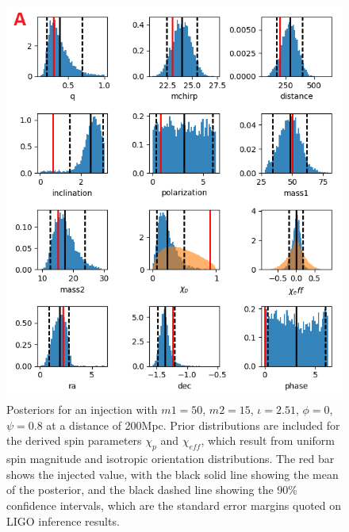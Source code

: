 \documentclass[11pt]{article}
\begin{document}
\begin{figure}
	\includegraphics[width=1\textwidth]{fig14.png}
	\centering
	\caption{Posteriors for an injection with $m1=50$, $m2=15$, $\iota=2.51$, $\phi=0$, $\psi=0.8$ at a distance of 200Mpc. Prior distributions are included for the derived spin parameters $\chi_p$ and $\chi_{eff}$, which result from uniform spin magnitude and isotropic orientation distributions. The red bar shows the injected value, with the black solid line showing the mean of the posterior, and the black dashed line showing the 90\% confidence intervals, which are the standard error margins quoted on LIGO inference results.}
	\centering
\end{figure}
\end{document}

